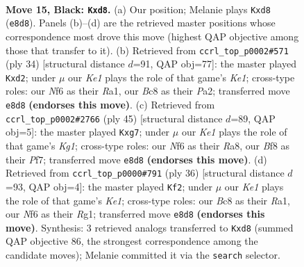 \documentclass[11pt]{article}
\begin{document}
\clearpage

\begin{figure}[p]\centering
\begin{subfigure}{0.46\textwidth}\centering
\resizebox{\linewidth}{!}{%
\newchessgame
\chessboard[
  setfen={r1bRkb1r/5ppp/2p1pn2/p1P3N1/5P1P/4P3/PP6/RNB3K1 b - - 2 15},
  showmover=false,
  pgfstyle=straightmove, color=movearrow, markmove={e8-d8}
]}
\caption{}
\end{subfigure}\hfill
\begin{subfigure}{0.46\textwidth}\centering
\resizebox{\linewidth}{!}{%
\newchessgame
\chessboard[
  setfen={r1b1k3/pp3p1p/2n1p1r1/8/2PPN3/8/P2b1PPP/R3KB1R w KQq - 0 18},
  showmover=false,
  pgfstyle=straightmove, color=movearrow, markmove={e1-d2}
]}
\caption{}
\end{subfigure}
\\[4pt]
\begin{subfigure}{0.46\textwidth}\centering
\resizebox{\linewidth}{!}{%
\newchessgame
\chessboard[
  setfen={r5k1/4ppB1/6pp/ppr2b2/3N3P/2P5/PP3PP1/R3R1K1 b - - 0 23},
  showmover=false,
  pgfstyle=straightmove, color=movearrow, markmove={g8-g7}
]}
\caption{}
\end{subfigure}\hfill
\begin{subfigure}{0.46\textwidth}\centering
\resizebox{\linewidth}{!}{%
\newchessgame
\chessboard[
  setfen={4k2r/1r1n1pp1/p1b1p3/3n4/2p3Pp/2N2P2/PP2P1BP/R1B1K1R1 w k - 1 19},
  showmover=false,
  pgfstyle=straightmove, color=movearrow, markmove={e1-f2}
]}
\caption{}
\end{subfigure}
\caption{\textbf{Move 15, Black: \texttt{Kxd8}.} (a) Our position; Melanie plays \texttt{Kxd8} (\texttt{e8d8}). Panels (b)--(d) are the retrieved master positions whose correspondence most drove this move (highest QAP objective among those that transfer to it). (b) Retrieved from \texttt{ccrl\_top\_p0002\#571} (ply 34) [structural distance $d$=91, QAP obj=77]: the master played \texttt{Kxd2}; under $\mu$ our \emph{Ke1} plays the role of that game's \emph{Ke1}; cross-type roles: our \emph{N}f6 as their \emph{R}a1, our \emph{B}c8 as their \emph{P}a2; transferred move \texttt{e8d8} \textbf{(endorses this move)}. (c) Retrieved from \texttt{ccrl\_top\_p0002\#2766} (ply 45) [structural distance $d$=89, QAP obj=5]: the master played \texttt{Kxg7}; under $\mu$ our \emph{Ke1} plays the role of that game's \emph{Kg1}; cross-type roles: our \emph{N}f6 as their \emph{R}a8, our \emph{B}f8 as their \emph{P}f7; transferred move \texttt{e8d8} \textbf{(endorses this move)}. (d) Retrieved from \texttt{ccrl\_top\_p0000\#791} (ply 36) [structural distance $d$=93, QAP obj=4]: the master played \texttt{Kf2}; under $\mu$ our \emph{Ke1} plays the role of that game's \emph{Ke1}; cross-type roles: our \emph{B}c8 as their \emph{R}a1, our \emph{N}f6 as their \emph{R}g1; transferred move \texttt{e8d8} \textbf{(endorses this move)}. Synthesis: 3 retrieved analogs transferred to \texttt{Kxd8} (summed QAP objective 86, the strongest correspondence among the candidate moves); Melanie committed it via the \texttt{search} selector.}
\label{fig:thought-m29}
\end{figure}
\end{document}
